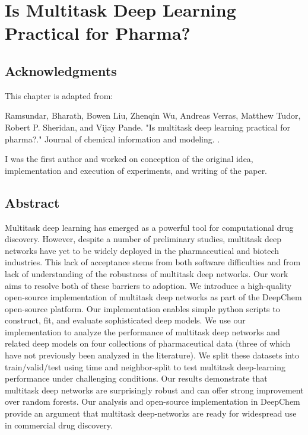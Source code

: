 \section{Is Multitask Deep Learning Practical for Pharma?}

\subsection{Acknowledgments}

This chapter is adapted from: 

Ramsundar, Bharath, Bowen Liu, Zhenqin Wu, Andreas Verras, Matthew Tudor, Robert P. Sheridan, and Vijay Pande. "Is multitask deep learning practical for pharma?." Journal of chemical information and modeling. \cite{ramsundar2017multitask}.

I was the first author and worked on conception of the original idea, implementation and execution of experiments, and writing of the paper.



\subsection{Abstract}
Multitask deep learning has emerged as a powerful tool for computational drug discovery. However, despite a number of preliminary studies, multitask deep networks have yet to be widely deployed in the pharmaceutical and biotech industries. This lack of acceptance stems from both software difficulties and from lack of understanding of the robustness of multitask deep networks. Our work aims to resolve both of these barriers to adoption. We introduce a high-quality open-source implementation of multitask deep networks as part of the DeepChem open-source platform. Our implementation enables simple python scripts to construct, fit, and evaluate sophisticated deep models. We use our implementation to analyze the performance of multitask deep networks and related deep models on four collections of pharmaceutical data (three of which have not previously been analyzed in the literature). We split these datasets into train/valid/test using time and neighbor-split to test multitask deep-learning performance under challenging conditions. Our results demonstrate that multitask deep networks are surprisingly robust and can offer strong improvement over random forests. Our analysis and open-source implementation in DeepChem provide an argument that multitask deep-networks are ready for widespread use in commercial drug discovery. 


